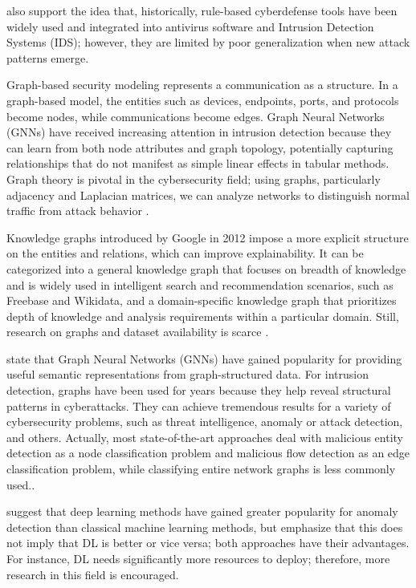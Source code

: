 \documentclass[final,5p,times,twocolumn]{elsarticle}
\begin{document}
\cite{bilot2023graph} also support the idea that, historically, rule-based cyberdefense tools have been widely used and integrated into antivirus software and Intrusion Detection Systems (IDS); however, they are limited by poor generalization when new attack patterns emerge.

Graph-based security modeling represents a communication as a structure. In a graph-based model, the entities such as devices, endpoints, ports, and protocols become nodes, while communications become edges. Graph Neural Networks (GNNs) have received increasing attention in intrusion detection because they can learn from both node attributes and graph topology, potentially capturing relationships that do not manifest as simple linear effects in tabular methods. Graph theory is pivotal in the cybersecurity field; using graphs, particularly adjacency and Laplacian matrices, we can analyze networks to distinguish normal traffic from attack behavior \citep{zhong2024survey,bilot2023graph,jaber_spectral_2025}.

Knowledge graphs introduced by Google in 2012 impose a more explicit structure on the entities and relations, which can improve explainability. It can be categorized into a general knowledge graph that focuses on breadth of knowledge and is widely used in intelligent search and recommendation scenarios, such as Freebase and Wikidata, and a domain-specific knowledge graph that prioritizes depth of knowledge and analysis requirements within a particular domain. Still, research on graphs and dataset availability is scarce \citep{li2024cybersecurity}.

\cite{bilot2023graph} state that Graph Neural Networks (GNNs) have gained popularity for providing useful semantic representations from graph-structured data. For intrusion detection, graphs have been used for years because they help reveal structural patterns in cyberattacks. They can achieve tremendous results for a variety of cybersecurity problems, such as threat intelligence, anomaly or attack detection, and others. Actually, most state-of-the-art approaches deal with malicious entity detection as a node classification problem and malicious flow detection as an edge classification problem, while classifying entire network graphs is less commonly used.\citep{bilot2023graph}.

\cite{gokstorp_machine_2026} suggest that deep learning methods have gained greater popularity for anomaly detection than classical machine learning methods, but emphasize that this does not imply that DL is better or vice versa; both approaches have their advantages. For instance, DL needs significantly more resources to deploy; therefore, more research in this field is encouraged.
\end{document}
